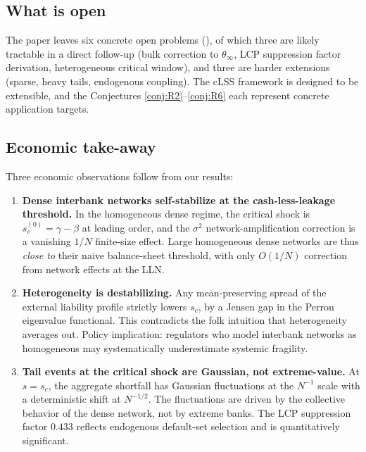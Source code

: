 \documentclass[11pt,a4paper]{article}
\theoremstyle{definition}
\begin{document}
\subsection{What is open}

The paper leaves six concrete open problems (), of which
three are likely tractable in a direct follow-up (bulk correction to $\theta_\infty$, LCP
suppression factor derivation, heterogeneous critical window), and three
are harder extensions (sparse, heavy tails, endogenous coupling). The
cLSS framework is designed to be extensible, and the Conjectures
\ref{conj:R2}--\ref{conj:R6} each represent concrete application targets.

\subsection{Economic take-away}

Three economic observations follow from our results:

\begin{enumerate}[leftmargin=1.5em]
\item \textbf{Dense interbank networks self-stabilize at the cash-less-leakage
  threshold.} In the homogeneous dense regime, the critical shock is
  $s_c^{(0)} = \gamma - \beta$ at leading order, and the $\sigma^2$
  network-amplification correction is a vanishing $1/N$ finite-size effect.
  Large homogeneous dense networks are thus \emph{close to} their naive
  balance-sheet threshold, with only $O(1/N)$ correction from network effects
  at the LLN.
\item \textbf{Heterogeneity is destabilizing.} Any mean-preserving spread of
  the external liability profile strictly lowers $s_c$, by a Jensen gap in
  the Perron eigenvalue functional. This contradicts the folk intuition that
  heterogeneity averages out. Policy implication: regulators who model
  interbank networks as homogeneous may systematically underestimate systemic
  fragility.
\item \textbf{Tail events at the critical shock are Gaussian, not extreme-value.}
  At $s = s_c$, the aggregate shortfall has Gaussian fluctuations at the
  $N^{-1}$ scale with a deterministic shift at $N^{-1/2}$. The fluctuations
  are driven by the collective behavior of the dense network, not by extreme
  banks. The LCP suppression factor $0.433$ reflects endogenous
  default-set selection and is quantitatively significant.
\end{enumerate}
\end{document}

